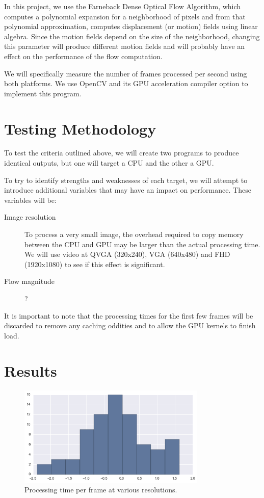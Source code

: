 \documentclass{article}
\begin{document}
In this project, we use the Farneback Dense Optical Flow Algorithm, which 
computes a polynomial expansion for a neighborhood of pixels and from that 
polynomial approximation, computes displacement (or motion) fields using linear
algebra. Since the motion fields depend on the size of the neighborhood, 
changing this parameter will produce different motion fields and will probably 
have an effect on the performance of the flow computation.

We will specifically measure the number of frames processed per second using
both platforms. We use OpenCV and its GPU acceleration compiler option to 
implement this program. 
\section{Testing Methodology}
To test the criteria outlined above, we will create two programs to produce
identical outputs, but one will target a CPU and the other a GPU.

To try to identify strengths and weaknesses of each target, we will attempt to
introduce additional variables that may have an impact on performance. These
variables will be:

\begin{description}
  \item[Image resolution] To process a very small image, the overhead required
    to copy memory between the CPU and GPU may be larger than the actual
    processing time. We will use video at QVGA (320x240), VGA (640x480) and FHD
    (1920x1080) to see if this effect is significant.
  \item[Flow magnitude] ?
\end{description}

It is important to note that the processing times for the first few frames will
be discarded to remove any caching oddities and to allow the GPU kernels to
finish load.

\section{Results}

\begin{figure}[H]
  \centering
    \includegraphics[width=0.8\textwidth]{test_resolution.png}
  \caption{Processing time per frame at various resolutions.}
\end{figure}
\end{document}
